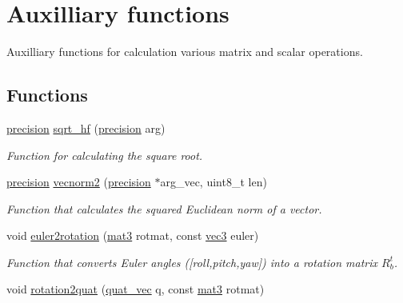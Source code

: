 \hypertarget{group__aux__func}{
\section{\-Auxilliary functions}
\label{group__aux__func}
}


\-Auxilliary functions for calculation various matrix and scalar operations.  


\subsection*{\-Functions}
\begin{DoxyCompactItemize}
\item 
\hyperlink{nav__types_8h_a37e1884b1f06826c49607cec459b4e8a}{precision} \hyperlink{group__aux__func_gabf788491b9a7053e88a954b41f74b8f7}{sqrt\-\_\-hf} (\hyperlink{nav__types_8h_a37e1884b1f06826c49607cec459b4e8a}{precision} arg)
\begin{DoxyCompactList}\small\item\em \-Function for calculating the square root. \end{DoxyCompactList}\item 
\hyperlink{nav__types_8h_a37e1884b1f06826c49607cec459b4e8a}{precision} \hyperlink{group__aux__func_ga54eaa66071c6606e7dbad9673e8418a1}{vecnorm2} (\hyperlink{nav__types_8h_a37e1884b1f06826c49607cec459b4e8a}{precision} $\ast$arg\-\_\-vec, uint8\-\_\-t len)
\begin{DoxyCompactList}\small\item\em \-Function that calculates the squared \-Euclidean norm of a vector. \end{DoxyCompactList}\item 
void \hyperlink{group__aux__func_ga59b1148a3b2039b267dc5b740aa2196a}{euler2rotation} (\hyperlink{nav__types_8h_ab7675278cb555aa98b43c97694753329}{mat3} rotmat, const \hyperlink{nav__types_8h_a90c683614d896321009d3b3c401b764f}{vec3} euler)
\begin{DoxyCompactList}\small\item\em \-Function that converts \-Euler angles (\mbox{[}roll,pitch,yaw\mbox{]}) into a rotation matrix $R_b^t$. \end{DoxyCompactList}\item 
void \hyperlink{group__aux__func_gaa74b4197980d69d90ff0bb2299df74e1}{rotation2quat} (\hyperlink{nav__types_8h_ad9a64f455fa02affaba6740746aae7b2}{quat\-\_\-vec} q, const \hyperlink{nav__types_8h_ab7675278cb555aa98b43c97694753329}{mat3} rotmat)

\end{DoxyCompactItemize}
